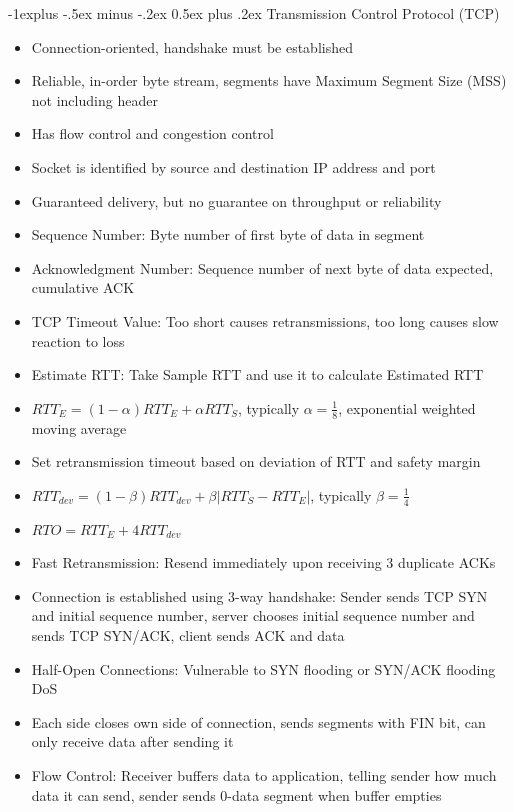 \documentclass[10pt, landscape]{article}
\makeatletter
\renewcommand{\section}{\@startsection{section}{1}{0mm}%
                                {-1ex plus -.5ex minus -.2ex}%
                                {0.5ex plus .2ex}%
                                {\normalfont\large\bfseries}}
\renewcommand{\section}{\@startsection{section}{2}{0mm}%
                                {-1explus -.5ex minus -.2ex}%
                                {0.5ex plus .2ex}%
                                {\normalfont\normalsize\bfseries}}
\makeatother
\begin{document}
\begin{multicols*}{3}
\section{Transmission Control Protocol (TCP)}
\begin{itemize}
    \item Connection-oriented, handshake must be established
    \item Reliable, in-order byte stream, segments have Maximum Segment Size (MSS) not including header
    \item Has flow control and congestion control
    \item Socket is identified by source and destination IP address and port
    \item Guaranteed delivery, but no guarantee on throughput or reliability
    \item Sequence Number: Byte number of first byte of data in segment
    \item Acknowledgment Number: Sequence number of next byte of data expected, cumulative ACK
    \item TCP Timeout Value: Too short causes retransmissions, too long causes slow reaction to loss
    \item Estimate RTT: Take Sample RTT and use it to calculate Estimated RTT
    \item $RTT_E=(1-\alpha)RTT_E+\alpha RTT_S$, typically $\alpha=\frac{1}{8}$, exponential weighted moving average
    \item Set retransmission timeout based on deviation of RTT and safety margin
    \item $RTT_{dev}=(1-\beta)RTT_{dev}+\beta |RTT_S-RTT_E|$, typically $\beta=\frac{1}{4}$
    \item $RTO=RTT_E+4RTT_{dev}$
    \item Fast Retransmission: Resend immediately upon receiving 3 duplicate ACKs
    \item Connection is established using 3-way handshake: Sender sends TCP SYN and initial sequence number, server chooses initial sequence number and sends TCP SYN/ACK, client sends ACK and data
    \item Half-Open Connections: Vulnerable to SYN flooding or SYN/ACK flooding DoS
    \item Each side closes own side of connection, sends segments with FIN bit, can only receive data after sending it
    \item Flow Control: Receiver buffers data to application, telling sender how much data it can send, sender sends 0-data segment when buffer empties

\end{itemize}
\end{multicols*}
\end{document}
